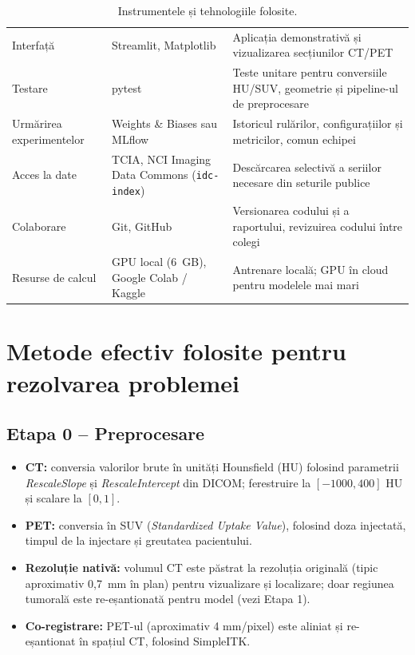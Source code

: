 \documentclass[11pt, a4paper]{article}
\begin{document}
\begin{table}[h]
\begin{tabular}{@{}p{3.3cm}p{4.2cm}p{7.1cm}@{}}
Interfață & Streamlit, Matplotlib & Aplicația demonstrativă și vizualizarea secțiunilor CT/PET \\
Testare & pytest & Teste unitare pentru conversiile HU/SUV, geometrie și pipeline-ul de preprocesare \\
Urmărirea experimentelor & Weights \& Biases sau MLflow & Istoricul rulărilor, configurațiilor și metricilor, comun echipei \\
Acces la date & TCIA, NCI Imaging Data Commons (\texttt{idc-index}) & Descărcarea selectivă a seriilor necesare din seturile publice \\
Colaborare & Git, GitHub & Versionarea codului și a raportului, revizuirea codului între colegi \\
Resurse de calcul & GPU local (6~GB), Google Colab / Kaggle & Antrenare locală; GPU în cloud pentru modelele mai mari \\ \bottomrule
\end{tabular}
\caption{Instrumentele și tehnologiile folosite.}
\end{table}

\section{Metode efectiv folosite pentru rezolvarea problemei}
\label{sec:metode}

\subsection{Etapa 0 -- Preprocesare}
\begin{itemize}
    \item \textbf{CT:} conversia valorilor brute în unități Hounsfield (HU) folosind parametrii \textit{RescaleSlope} și \textit{RescaleIntercept} din DICOM; ferestruire la $[-1000, 400]$ HU și scalare la $[0,1]$.
    \item \textbf{PET:} conversia în SUV (\textit{Standardized Uptake Value}), folosind doza injectată, timpul de la injectare și greutatea pacientului.
    \item \textbf{Rezoluție nativă:} volumul CT este păstrat la rezoluția originală (tipic aproximativ 0,7~mm în plan) pentru vizualizare și localizare; doar regiunea tumorală este re-eșantionată pentru model (vezi Etapa 1).
    \item \textbf{Co-registrare:} PET-ul (aproximativ 4 mm/pixel) este aliniat și re-eșantionat în spațiul CT, folosind SimpleITK.
\end{itemize}
\end{document}
